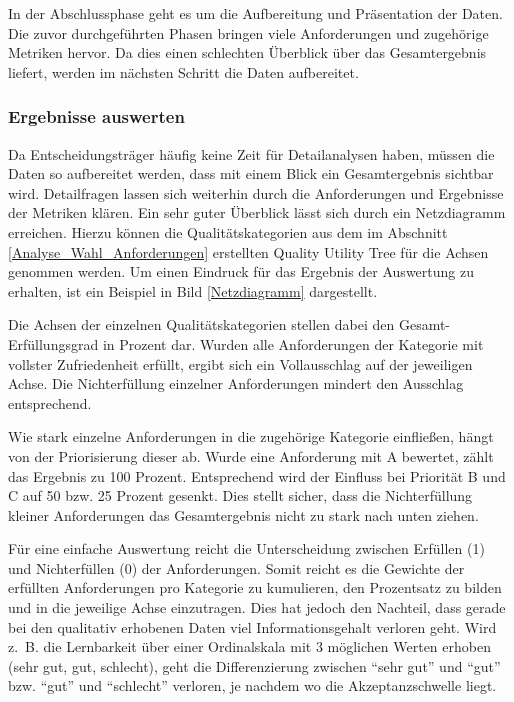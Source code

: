 
In der Abschlussphase geht es um die Aufbereitung und Präsentation der Daten. Die zuvor durchgeführten Phasen bringen viele Anforderungen und zugehörige Metriken hervor. Da dies einen schlechten Überblick über das Gesamtergebnis liefert, werden im nächsten Schritt die Daten aufbereitet.

\subsubsection{Ergebnisse auswerten}\label{Ergebnisse_auswerten}

Da Entscheidungsträger häufig keine Zeit für Detailanalysen haben, müssen die Daten so aufbereitet werden, dass mit einem Blick ein Gesamtergebnis sichtbar wird. Detailfragen lassen sich weiterhin durch die Anforderungen und Ergebnisse der Metriken klären. Ein sehr guter Überblick lässt sich durch ein Netzdiagramm erreichen. Hierzu können die Qualitätskategorien aus dem im Abschnitt \ref{Analyse_Wahl_Anforderungen} erstellten Quality Utility Tree für die Achsen genommen werden. Um einen Eindruck für das Ergebnis der Auswertung zu erhalten, ist ein Beispiel in Bild \ref{Netzdiagramm} dargestellt.


Die Achsen der einzelnen Qualitätskategorien stellen dabei den Gesamt-Erfüllungsgrad in Prozent dar. Wurden alle Anforderungen der Kategorie mit vollster Zufriedenheit erfüllt, ergibt sich ein Vollausschlag auf der jeweiligen Achse. Die Nichterfüllung einzelner Anforderungen mindert den Ausschlag entsprechend.

Wie stark einzelne Anforderungen in die zugehörige Kategorie einfließen, hängt von der Priorisierung dieser ab. Wurde eine Anforderung mit A bewertet, zählt das Ergebnis zu 100 Prozent. Entsprechend wird der Einfluss bei Priorität B und C auf 50 bzw. 25 Prozent gesenkt. Dies stellt sicher, dass die Nichterfüllung kleiner Anforderungen das Gesamtergebnis nicht zu stark nach unten ziehen. 

Für eine einfache Auswertung reicht die Unterscheidung zwischen Erfüllen (1) und Nichterfüllen (0) der Anforderungen. Somit reicht es die Gewichte der erfüllten Anforderungen pro Kategorie zu kumulieren, den Prozentsatz zu bilden und in die jeweilige Achse einzutragen. Dies hat jedoch den Nachteil, dass gerade bei den qualitativ erhobenen Daten viel Informationsgehalt verloren geht. Wird z.~B. die Lernbarkeit über einer Ordinalskala mit 3 möglichen Werten erhoben (sehr gut, gut, schlecht), geht die Differenzierung zwischen \enquote{sehr gut} und \enquote{gut} bzw. \enquote{gut} und \enquote{schlecht} verloren, je nachdem wo die Akzeptanzschwelle liegt.

